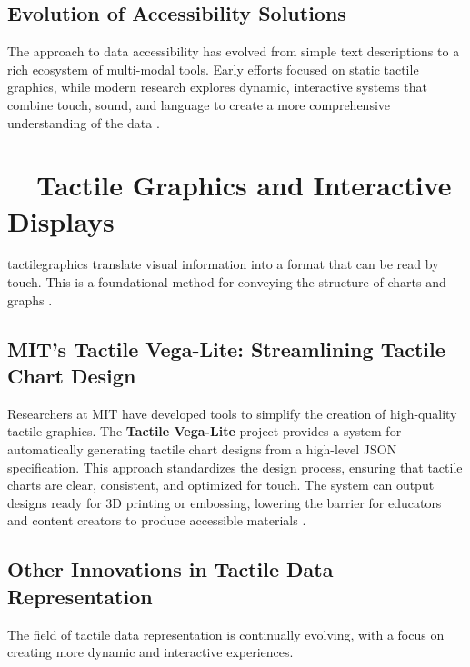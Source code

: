 \subsection{Evolution of Accessibility Solutions}\label{ch13:ssec:evolution}
The approach to data accessibility has evolved from simple text descriptions to a rich ecosystem of multi-modal tools. Early efforts focused on static tactile graphics, while modern research explores dynamic, interactive systems that combine touch, sound, and language to create a more comprehensive understanding of the data \supercite{Zewe2022Making, Lundgard2022Accessible}.

\section{~~Tactile Graphics and Interactive Displays}\label{ch13:sec:tactile-graphics}
\gls{tactilegraphics} translate visual information into a format that can be read by touch. This is a foundational method for conveying the structure of charts and graphs \supercite{CreatingTactileGraphics}.

\subsection{MIT's Tactile Vega-Lite: Streamlining Tactile Chart Design}\label{ch13:ssec:tactile-vega-lite}
Researchers at MIT have developed tools to simplify the creation of high-quality tactile graphics. The \textbf{Tactile Vega-Lite} project provides a system for automatically generating tactile chart designs from a high-level JSON specification. This approach standardizes the design process, ensuring that tactile charts are clear, consistent, and optimized for touch. The system can output designs ready for 3D printing or embossing, lowering the barrier for educators and content creators to produce accessible materials \supercite{TactileVegaLite}.

\subsection{Other Innovations in Tactile Data Representation}\label{ch13:ssec:tactile-innovations}
The field of tactile data representation is continually evolving, with a focus on creating more dynamic and interactive experiences.

